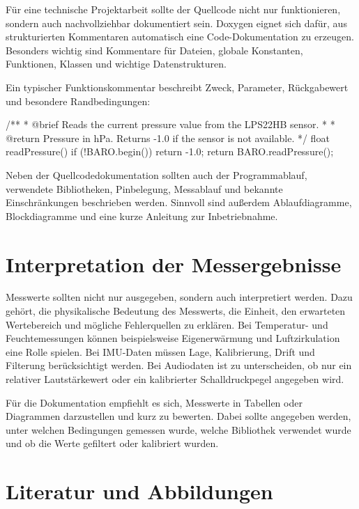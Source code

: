 Für eine technische Projektarbeit sollte der Quellcode nicht nur funktionieren, sondern auch nachvollziehbar dokumentiert sein. Doxygen eignet sich dafür, aus strukturierten Kommentaren automatisch eine Code-Dokumentation zu erzeugen. Besonders wichtig sind Kommentare für Dateien, globale Konstanten, Funktionen, Klassen und wichtige Datenstrukturen.

Ein typischer Funktionskommentar beschreibt Zweck, Parameter, Rückgabewert und besondere Randbedingungen:

\begin{code}
\begin{Arduino}
/**
 * @brief Reads the current pressure value from the LPS22HB sensor.
 *
 * @return Pressure in hPa. Returns -1.0 if the sensor is not available.
 */
float readPressure()
{
	if (!BARO.begin()) {
		return -1.0;
	}
	return BARO.readPressure();
}
\end{Arduino}
\caption{Beispiel für einen Doxygen-kompatiblen Funktionskommentar}
\label{code:doxygen}
\end{code}

Neben der Quellcodedokumentation sollten auch der Programmablauf, verwendete Bibliotheken, Pinbelegung, Messablauf und bekannte Einschränkungen beschrieben werden. Sinnvoll sind außerdem Ablaufdiagramme, Blockdiagramme und eine kurze Anleitung zur Inbetriebnahme.

\section{Interpretation der Messergebnisse}

Messwerte sollten nicht nur ausgegeben, sondern auch interpretiert werden. Dazu gehört, die physikalische Bedeutung des Messwerts, die Einheit, den erwarteten Wertebereich und mögliche Fehlerquellen zu erklären. Bei Temperatur- und Feuchtemessungen können beispielsweise Eigenerwärmung und Luftzirkulation eine Rolle spielen. Bei IMU-Daten müssen Lage, Kalibrierung, Drift und Filterung berücksichtigt werden. Bei Audiodaten ist zu unterscheiden, ob nur ein relativer Lautstärkewert oder ein kalibrierter Schalldruckpegel angegeben wird.

Für die Dokumentation empfiehlt es sich, Messwerte in Tabellen oder Diagrammen darzustellen und kurz zu bewerten. Dabei sollte angegeben werden, unter welchen Bedingungen gemessen wurde, welche Bibliothek verwendet wurde und ob die Werte gefiltert oder kalibriert wurden.

\section{Literatur und Abbildungen}

